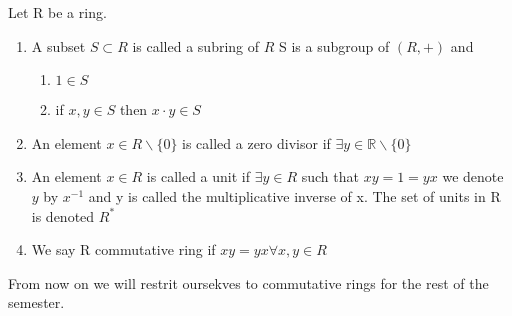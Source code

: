 \documentclass{article}
\begin{document}
\begin{definition}
    Let R be a ring. \begin{enumerate}
        \item A subset $S \subset R$ is called a subring of $R$ 
        S is a subgroup of $(R, +)$ and \begin{enumerate}
            \item $1 \in S$ 
            \item if $x, y \in S$ then $x\cdot y \in S$ 
            
        \end{enumerate}
        \item An element $x \in R \backslash \{0\}$ is called a zero divisor if $\exists y \in \mathbb{R} \backslash \{0\}$
        \item An element $x\in R$ is called a unit if $\exists y \in R$ such that $xy = 1 = yx$ we denote $y $ by $x^{-1}$ and y is called the multiplicative inverse of x. The set of units in R is denoted $R^*$
        \item We say R commutative ring if $xy = yx \forall x,y \in R$
    \end{enumerate}
\end{definition}
From now on we will restrit oursekves to commutative rings for the rest of the semester. 
\end{document}
